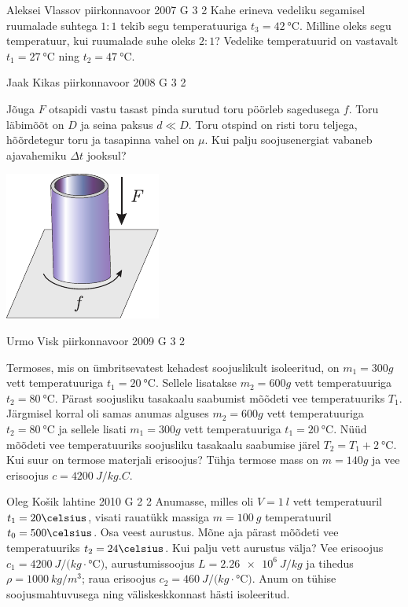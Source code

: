 \documentclass[11pt, twoside]{article}
\begin{document}
{%
{Aleksei Vlassov} %
{piirkonnavoor} %
{2007} %
{G 3} %
{2} %
{
\ifStatement
Kahe erineva vedeliku segamisel ruumalade suhtega $1 : 1$ tekib segu temperatuuriga $t_3 = \SI{42}{\celsius}$. Milline oleks segu temperatuur, kui ruumalade suhe oleks $2 : 1$? Vedelike temperatuurid on vastavalt $t_1 = \SI{27}{\celsius}$ ning $t_2 = \SI{47}{\celsius}$.
\fi
}

{Jaak Kikas} %
{piirkonnavoor} %
{2008} %
{G 3} %
{2} %
{
\ifStatement
Jõuga $F$ otsapidi vastu tasast pinda surutud toru pöörleb sagedusega $f$. Toru läbimõõt on $D$ ja seina paksus $d \ll D$. Toru otspind on risti toru teljega, hõõrdetegur toru ja tasapinna vahel on $\mu$. Kui palju soojusenergiat vabaneb ajavahemiku $\Delta t$ jooksul?

\begin{center}
	\includegraphics[width=0.3\linewidth]{2008-v2g-03-yl}
\end{center}
\fi
}

{Urmo Visk} %
{piirkonnavoor} %
{2009} %
{G 3} %
{2} %
{
\ifStatement
Termoses, mis on ümbritsevatest kehadest soojuslikult isoleeritud, on $m_1 = \SI{300}g$ vett temperatuuriga $t_1 = \SI{20}{\celsius}$. Sellele lisatakse $m_2 = \SI{600}g$ vett temperatuuriga $t_2 = \SI{80}{\celsius}$. Pärast soojusliku
tasakaalu saabumist mõõdeti vee temperatuuriks $T_1$. Järgmisel korral oli
samas anumas alguses $m_2 = \SI{600}g$ vett temperatuuriga $t_2 = \SI{80}{\celsius}$ ja sellele lisati $m_1 = \SI{300}g$ vett temperatuuriga $t_1 = \SI{20}{\celsius}$. Nüüd mõõdeti vee temperatuuriks soojusliku tasakaalu saabumise järel $T_2 = T_1+\SI{2}{\celsius}$. Kui
suur on termose materjali erisoojus? Tühja termose mass on $m = \SI{140}g$ ja vee erisoojus $c = \SI{4200}{J/kg.C}$.

\fi
}

{Oleg Košik} %
{lahtine} %
{2010} %
{G 2} %
{2} %
{
\ifStatement
Anumasse, milles oli $V=\SI{1}{l}$ vett temperatuuril $t_1=20\celsius$,
visati rauatükk massiga $m=\SI{100}{g}$ temperatuuril $t_0=500\celsius$. Osa
veest aurustus. Mõne aja pärast mõõdeti vee temperatuuriks
$t_2=24\celsius$. Kui palju vett aurustus välja? Vee erisoojus
$c_1=\SI{4200}{J/(kg\cdot\celsius)}$, aurustumissoojus $L=\SI{2,26 e6}{J/kg}$ ja
tihedus $\rho=\SI{1000}{kg/m^3}$; raua
erisoojus $c_2=\SI{460}{J/(kg\cdot\celsius)}$. Anum on tühise soojusmahtuvusega ning väliskeskkonnast
hästi isoleeritud.
\fi
}

}
\end{document}
